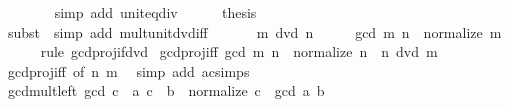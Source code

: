 \begin{isabellebody}
\ \ \ \ \ \ \isamarkupfalse%
\ {\isacharparenleft}{\kern0pt}simp\ add{\isacharcolon}{\kern0pt}\ unit{\isacharunderscore}{\kern0pt}eq{\isacharunderscore}{\kern0pt}div{}{\isacharparenright}{\kern0pt}\isanewline
\ \ \ \ \isamarkupfalse%
\ {\isacharquery}{\kern0pt}thesis\isanewline
\ \ \ \ \ \ \isamarkupfalse%
\ {\isacharparenleft}{\kern0pt}subst\ {\isacharasterisk}{\kern0pt}{\isacharasterisk}{\kern0pt}{\isacharparenright}{\kern0pt}\ {\isacharparenleft}{\kern0pt}simp\ add{\isacharcolon}{\kern0pt}\ mult{\isacharunderscore}{\kern0pt}unit{\isacharunderscore}{\kern0pt}dvd{\isacharunderscore}{\kern0pt}iff{\isacharparenright}{\kern0pt}\isanewline
\ \ \isamarkupfalse%
\isanewline
{}\isamarkupfalse%
\isanewline
\ \ \isamarkupfalse%
\ {\isachardoublequoteopen}m\ dvd\ n{\isachardoublequoteclose}\isanewline
\ \ \isamarkupfalse%
\ \isamarkupfalse%
\ {\isachardoublequoteopen}gcd\ m\ n\ {\isacharequal}{\kern0pt}\ normalize\ m{\isachardoublequoteclose}\isanewline
\ \ \ \ \isamarkupfalse%
\ {\isacharparenleft}{\kern0pt}rule\ gcd{\isacharunderscore}{\kern0pt}proj{}{\isacharunderscore}{\kern0pt}if{\isacharunderscore}{\kern0pt}dvd{\isacharparenright}{\kern0pt}\isanewline
{}\isamarkupfalse%
%
\endisatagproof
{\isafoldproof}%
%
\isadelimproof
\isanewline
%
\endisadelimproof
\isanewline
{}\isamarkupfalse%
\ gcd{\isacharunderscore}{\kern0pt}proj{}{\isacharunderscore}{\kern0pt}iff{\isacharcolon}{\kern0pt}\ {\isachardoublequoteopen}gcd\ m\ n\ {\isacharequal}{\kern0pt}\ normalize\ n\ {\isasymlongleftrightarrow}\ n\ dvd\ m{\isachardoublequoteclose}\isanewline
%
\isadelimproof
\ \ %
\endisadelimproof
%
\isatagproof
{}\isamarkupfalse%
\ gcd{\isacharunderscore}{\kern0pt}proj{}{\isacharunderscore}{\kern0pt}iff\ {\isacharbrackleft}{\kern0pt}of\ n\ m{\isacharbrackright}{\kern0pt}\ \isamarkupfalse%
\ {\isacharparenleft}{\kern0pt}simp\ add{\isacharcolon}{\kern0pt}\ ac{\isacharunderscore}{\kern0pt}simps{\isacharparenright}{\kern0pt}%
\endisatagproof
{\isafoldproof}%
%
\isadelimproof
\isanewline
%
\endisadelimproof
\isanewline
{}\isamarkupfalse%
\ gcd{\isacharunderscore}{\kern0pt}mult{\isacharunderscore}{\kern0pt}left{\isacharcolon}{\kern0pt}\ {\isachardoublequoteopen}gcd\ {\isacharparenleft}{\kern0pt}c\ {\isacharasterisk}{\kern0pt}\ a{\isacharparenright}{\kern0pt}\ {\isacharparenleft}{\kern0pt}c\ {\isacharasterisk}{\kern0pt}\ b{\isacharparenright}{\kern0pt}\ {\isacharequal}{\kern0pt}\ normalize\ {\isacharparenleft}{\kern0pt}c\ {\isacharasterisk}{\kern0pt}\ gcd\ a\ b{\isacharparenright}{\kern0pt}{\isachardoublequoteclose}\isanewline

\end{isabellebody}
